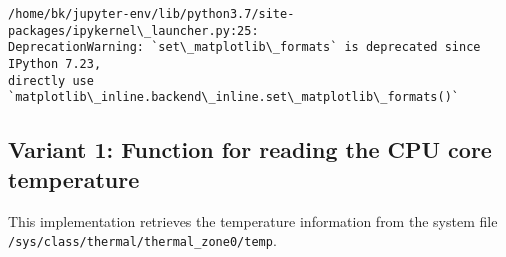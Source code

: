 \documentclass[11pt]{article}
\begin{document}
    \begin{Verbatim}[commandchars=\\\{\}]
/home/bk/jupyter-env/lib/python3.7/site-packages/ipykernel\_launcher.py:25:
DeprecationWarning: `set\_matplotlib\_formats` is deprecated since IPython 7.23,
directly use `matplotlib\_inline.backend\_inline.set\_matplotlib\_formats()`
    \end{Verbatim}

    \hypertarget{variant-1-function-for-reading-the-cpu-core-temperature}{%
\subsection{Variant 1: Function for reading the CPU core
temperature}\label{variant-1-function-for-reading-the-cpu-core-temperature}}

This implementation retrieves the temperature information from the
system file \texttt{/sys/class/thermal/thermal\_zone0/temp}.
\end{document}
